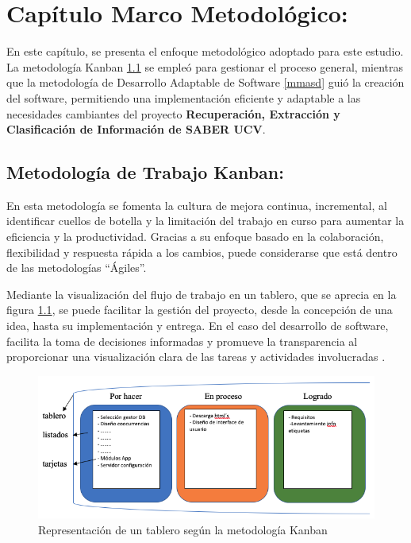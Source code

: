 \documentclass[
  12pt,
  openany]{book}
\begin{document}
\hypertarget{mm}{%
\chapter{Capítulo Marco Metodológico:}\label{mm}}

En este capítulo, se presenta el enfoque metodológico adoptado para este estudio. La metodología Kanban \ref{mmmetodologia} se empleó para gestionar el proceso general, mientras que la metodología de Desarrollo Adaptable de Software \ref{mmasd} guió la creación del software, permitiendo una implementación eficiente y adaptable a las necesidades cambiantes del proyecto \textbf{Recuperación, Extracción y Clasificación de Información de SABER UCV}.

\hypertarget{mmmetodologia}{%
\section{Metodología de Trabajo Kanban:}\label{mmmetodologia}}

En esta metodología se fomenta la cultura de mejora continua, incremental, al identificar cuellos de botella y la limitación del trabajo en curso para aumentar la eficiencia y la productividad. Gracias a su enfoque basado en la colaboración, flexibilidad y respuesta rápida a los cambios, puede considerarse que está dentro de las metodologías ``Ágiles''.

Mediante la visualización del flujo de trabajo en un tablero, que se aprecia en la figura \ref{fig:metkanban}, se puede facilitar la gestión del proyecto, desde la concepción de una idea, hasta su implementación y entrega. En el caso del desarrollo de software, facilita la toma de decisiones informadas y promueve la transparencia al proporcionar una visualización clara de las tareas y actividades involucradas \citep{stephens2015}.

\begin{figure}

{\centering \includegraphics[width=0.7\linewidth]{images/04-metodologia/01_kanban} 

}

\caption{Representación de un tablero según la metodología Kanban}\label{fig:metkanban}
\end{figure}
\end{document}
